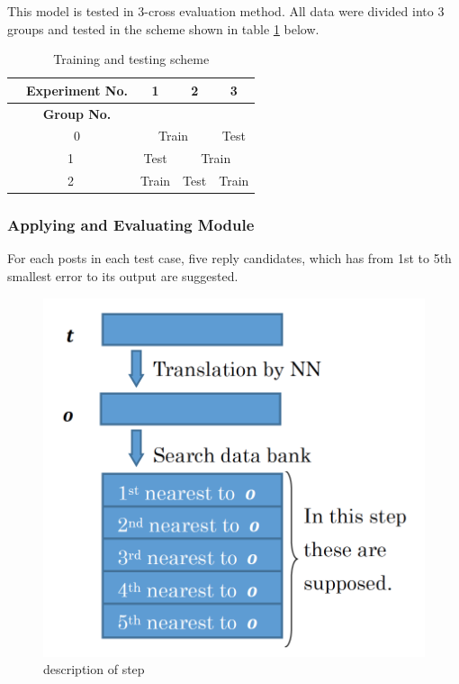 \documentclass{../style/sig-alternate}
\begin{document}
This model is tested in 3-cross evaluation method.
All data were divided into 3 groups and tested in the scheme shown in table \ref{tab:testing_scheme} below.

\begin{table}[h!]
  \centering
  \caption{Training and testing scheme}
  \label{tab:testing_scheme}
  \begin{tabular}{|c|c|c|c|} \hline
    　{\bf Experiment No.} & 1 & 2 & 3 \\ \hline
    　{\bf Group No.} & & & \\ \hline
    　0 & \multicolumn{2}{|c|}{Train} & Test \\ \hline
    1 & Test & \multicolumn{2}{|c|}{Train} \\ \hline
    2 & Train & Test & Train \\ \hline
  \end{tabular}
\end{table}

\subsubsection{Applying and Evaluating Module}
\label{sec:applying}

For each posts in each test case, five reply candidates, which has from 1st to 5th smallest error to its output are suggested.

\begin{figure}[h!]
 \begin{center}
  \includegraphics[width=120mm,bb=0 0 616 579]{../img/peter_fig01.png}
  \end{center}
  \caption{description of step}
  \label{fig:applying}
\end{figure}
\end{document}
